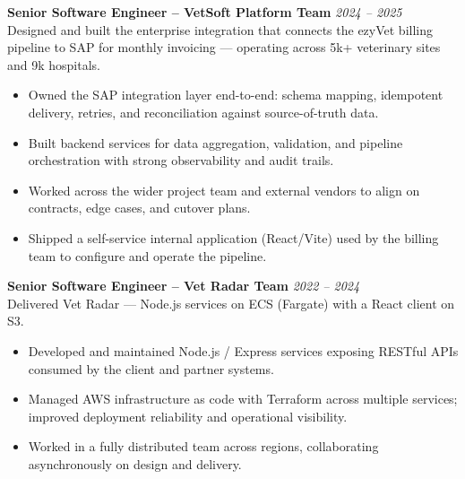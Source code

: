 \documentclass{resume}
\begin{document}
\vspace{1em}

\textbf{Senior Software Engineer – VetSoft Platform Team} \hfill \textit{2024 -- 2025} \\
Designed and built the enterprise integration that connects the ezyVet billing pipeline to SAP for monthly invoicing — operating across 5k+ veterinary sites and 9k hospitals.
\begin{itemize}
  \item Owned the SAP integration layer end-to-end: schema mapping, idempotent delivery, retries, and reconciliation against source-of-truth data.
  \item Built backend services for data aggregation, validation, and pipeline orchestration with strong observability and audit trails.
  \item Worked across the wider project team and external vendors to align on contracts, edge cases, and cutover plans.
  \item Shipped a self-service internal application (React/Vite) used by the billing team to configure and operate the pipeline.
\end{itemize}

\vspace{1em}

\textbf{Senior Software Engineer – Vet Radar Team} \hfill \textit{2022 -- 2024} \\
Delivered Vet Radar — Node.js services on ECS (Fargate) with a React client on S3.
\begin{itemize}
  \item Developed and maintained Node.js / Express services exposing RESTful APIs consumed by the client and partner systems.
  \item Managed AWS infrastructure as code with Terraform across multiple services; improved deployment reliability and operational visibility.
  \item Worked in a fully distributed team across regions, collaborating asynchronously on design and delivery.
\end{itemize}

\vspace{1em}
\end{document}
